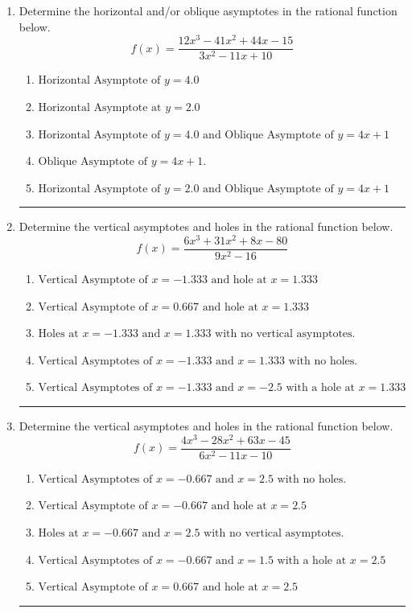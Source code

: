 \documentclass[14pt]{extbook}
\newcommand{\litem}[1]{\item#1\hspace*{-1cm}\rule{\textwidth}{0.4pt}}
\begin{document}
\begin{enumerate}
{\begin{enumerate}[label=\Alph*.]
\end{enumerate} }
\litem{
Determine the horizontal and/or oblique asymptotes in the rational function below.\[ f(x) = \frac{12x^{3} -41 x^{2} +44 x -15}{3x^{2} -11 x + 10} \]\begin{enumerate}[label=\Alph*.]
\item \( \text{Horizontal Asymptote of } y = 4.0  \)
\item \( \text{Horizontal Asymptote at } y = 2.0 \)
\item \( \text{Horizontal Asymptote of } y = 4.0 \text{ and Oblique Asymptote of } y = 4x + 1 \)
\item \( \text{Oblique Asymptote of } y = 4x + 1. \)
\item \( \text{Horizontal Asymptote of } y = 2.0 \text{ and Oblique Asymptote of } y = 4x + 1 \)

\end{enumerate} }
\litem{
Determine the vertical asymptotes and holes in the rational function below.\[ f(x) = \frac{6x^{3} +31 x^{2} +8 x -80}{9x^{2} -16} \]\begin{enumerate}[label=\Alph*.]
\item \( \text{Vertical Asymptote of } x = -1.333 \text{ and hole at } x = 1.333 \)
\item \( \text{Vertical Asymptote of } x = 0.667 \text{ and hole at } x = 1.333 \)
\item \( \text{Holes at } x = -1.333 \text{ and } x = 1.333 \text{ with no vertical asymptotes.} \)
\item \( \text{Vertical Asymptotes of } x = -1.333 \text{ and } x = 1.333 \text{ with no holes.} \)
\item \( \text{Vertical Asymptotes of } x = -1.333 \text{ and } x = -2.5 \text{ with a hole at } x = 1.333 \)

\end{enumerate} }
\litem{
Determine the vertical asymptotes and holes in the rational function below.\[ f(x) = \frac{4x^{3} -28 x^{2} +63 x -45}{6x^{2} -11 x -10} \]\begin{enumerate}[label=\Alph*.]
\item \( \text{Vertical Asymptotes of } x = -0.667 \text{ and } x = 2.5 \text{ with no holes.} \)
\item \( \text{Vertical Asymptote of } x = -0.667 \text{ and hole at } x = 2.5 \)
\item \( \text{Holes at } x = -0.667 \text{ and } x = 2.5 \text{ with no vertical asymptotes.} \)
\item \( \text{Vertical Asymptotes of } x = -0.667 \text{ and } x = 1.5 \text{ with a hole at } x = 2.5 \)
\item \( \text{Vertical Asymptote of } x = 0.667 \text{ and hole at } x = 2.5 \)


\end{enumerate}}
\end{enumerate}
\end{document}
